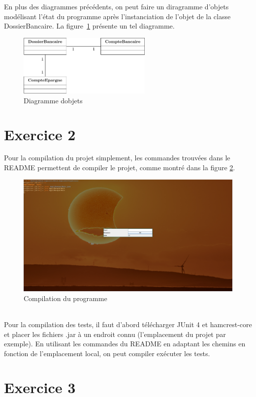 \documentclass[12pt]{article}
\begin{document}
En plus des diagrammes précédents, on peut faire un diragramme d'objets modélisant l'état du programme après l'instanciation de l'objet de la classe DossierBancaire.
La figure~\ref{UO1} présente un tel diagramme. 
\begin{figure}[h]
    \centering
    \includegraphics[height=3cm]{Diagrammes/UML_UO1.pdf}
    \caption{Diagramme d\textquotesingle objets\label{UO1}}
\end{figure}

\section{Exercice 2}

Pour la compilation du projet simplement, les commandes trouvées 
dans le README permettent de compiler le projet, comme montré dans la figure \ref{ScreenE2Q31}.
\begin{figure}[h]
    \centering
    \includegraphics[width=\textwidth]{img/Screenshots/E2_Q3_1.png}
    \caption{Compilation du programme\label{ScreenE2Q31}}
\end{figure}
\\
Pour la compilation des tests, il faut d'abord télécharger JUnit 4 et hamcrest-core et placer les fichiers .jar
à un endroit connu (l'emplacement du projet par exemple). En utilisant les commandes du README en adaptant les 
chemins en fonction de l'emplacement local, on peut compiler exécuter les tests.


\section{Exercice 3}
\end{document}
